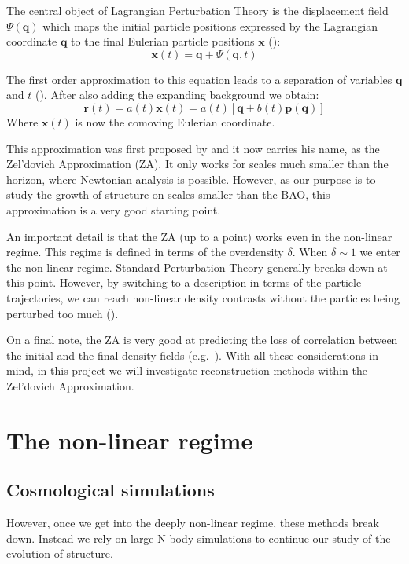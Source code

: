 The central object of Lagrangian Perturbation Theory is the displacement field $\Psi(\textbf{q})$ which maps the initial particle positions expressed by the Lagrangian coordinate $\textbf{q}$ to the final Eulerian particle positions $\textbf{x}$ (\cite{Bernardeau_PT}):
\begin{equation}
     \textbf{x}(t) = \textbf{q} + \Psi(\textbf{q}, t)
\end{equation}

The first order approximation to this equation leads to a separation of variables $\textbf{q}$ and $t$ (\cite{1993sfu..book.....P}). After also adding the expanding background we obtain:
\begin{equation}
    \textbf{r}(t) = a(t) \textbf{x}(t) = a(t) [\textbf{q} + b(t) \textbf{p}(\textbf{q})]
    \label{eq:2.2}
\end{equation}
Where $\textbf{x}(t)$ is now the comoving Eulerian coordinate.

This approximation was first proposed by \cite{1970A&A.....5...84Z} and it now carries his name, as the Zel'dovich Approximation (ZA). It only works for scales much smaller than the horizon, where Newtonian analysis is possible. However, as our purpose is to study the growth of structure on scales smaller than the BAO, this approximation is a very good starting point. 

An important detail is that the ZA (up to a point) works even in the non-linear regime. This regime is defined in terms of the overdensity $\delta$. When $\delta \sim 1$ we enter the non-linear regime. Standard Perturbation Theory generally breaks down at this point. However, by switching to a description in terms of the particle trajectories, we can reach non-linear density contrasts without the particles being perturbed too much (\cite{1993sfu..book.....P}).

On a final note, the ZA is very good at predicting the loss of correlation between the initial and the final density fields (e.g.~\cite{2016PhRvD..93j3519P}). With all these considerations in mind, in this project we will investigate reconstruction methods within the Zel'dovich Approximation.

\section{The non-linear regime}

\subsection{Cosmological simulations}
 However, once we get into the deeply non-linear regime, these methods break down. Instead we rely on large N-body simulations to continue our study of the evolution of structure.

